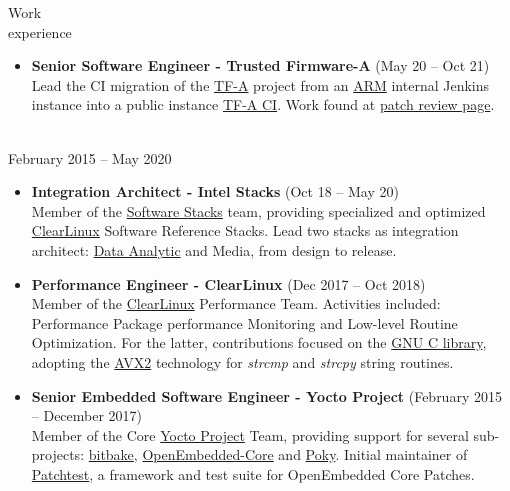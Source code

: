 \documentclass{resume}
\def\intel{Intel Corporation}
\def\cl{ClearLinux}
\begin{document}
\begin{category}{Work \\experience}
  \begin{itemize}
  \item \textbf{Senior Software Engineer - Trusted Firmware-A} (May 20 -- Oct 21)\\
    Lead the CI migration of the \href{https://www.trustedfirmware.org/projects/tf-a/}{TF-A}
    project from an \href{https://www.arm.com/}{ARM} internal Jenkins instance into a public instance \href{https://ci.trustedfirmware.org/}{TF-A CI}.
    Work found at \href{https://review.trustedfirmware.org/q/owner:leonardo.sandoval%2540linaro.org}{patch review page}.
  \end{itemize}

  \citem{\intel}\\
  February 2015 -- May 2020

  \begin{itemize}
  \item \textbf{Integration Architect - Intel Stacks} (Oct 18 -- May 20)\\
    Member of the \href{https://github.com/intel/stacks}{Software Stacks} team,
    providing specialized and optimized \href{https://clearlinux.org/}{\cl} Software Reference Stacks.
    Lead two stacks as integration architect:
    \href{https://github.com/intel/stacks/blob/master/dars/dars.rst}{Data Analytic}
    and Media, from design to release.
  \end{itemize}

  \begin{itemize}
  \item \textbf{Performance Engineer - ClearLinux} (Dec 2017 -- Oct 2018)\\
    Member of the \href{https://clearlinux.org/}{ClearLinux} Performance Team.
    Activities included: Performance Package performance Monitoring and Low-level Routine Optimization.
    For the latter, contributions focused on the \href{https://www.gnu.org/software/libc/}{GNU C library},
    adopting the \href{https://patchwork.ozlabs.org/project/glibc/list/?submitter=74072}{AVX2} technology
    for \textit{strcmp} and \textit{strcpy} string routines.
  \end{itemize}

  \begin{itemize}
  \item \textbf{Senior Embedded Software Engineer - Yocto Project} (February 2015 -- December 2017)\\
    Member of the Core \href{https://www.yoctoproject.org/}{Yocto Project} Team,
    providing support for several sub-projects:
    \href{https://lists.openembedded.org/g/bitbake-devel/search?p=recentpostdate%252Fsticky%2C%2C%2C20%2C2%2C0%2C0&q=Leonardo+Sandoval}{bitbake},
    \href{https://lists.openembedded.org/g/openembedded-core/search?p=recentpostdate%252Fsticky%2C%2C%2C20%2C2%2C0%2C0&q=Leonardo+Sandoval}{OpenEmbedded-Core} and
    \href{https://lists.yoctoproject.org/g/poky/search?p=created%2C0%2C%2C1%2C2%2C0%2C0&q=Leonardo+Sandoval}{Poky}. Initial maintainer of
    \href{https://git.yoctoproject.org/meta-patchtest/}{Patchtest},
    a framework and test suite for OpenEmbedded Core Patches.
  \end{itemize}


\end{category}
\end{document}
